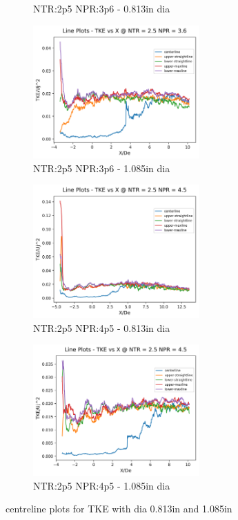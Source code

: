 \begin{figure}[H]
\begin{subfigure}{.5\textwidth}
	\caption{NTR:2p5 NPR:3p6 - 0.813in dia}
	\label{fig:lineplotsTKEb2p53p6}
\end{subfigure}%
\begin{subfigure}{.5\textwidth}
	\centering
	\includegraphics[width=2.5in]{images/LinePlots_TKE_NTR2p5_NPR3p6b.png}
	\caption{NTR:2p5 NPR:3p6 - 1.085in dia}
	\label{fig:lineplotsTKEb2p53p6b}
\end{subfigure}
\begin{subfigure}{.5\textwidth}
	\centering
	\includegraphics[width=2.5in]{images/LinePlots_TKE_NTR2p5_NPR4p5.png}
	\caption{NTR:2p5 NPR:4p5 - 0.813in dia}
	\label{fig:lineplotsTKEb2p54p5}
\end{subfigure}%
\begin{subfigure}{.5\textwidth}
	\centering
	\includegraphics[width=2.5in]{images/LinePlots_TKE_NTR2p5_NPR4p5b.png}
	\caption{NTR:2p5 NPR:4p5 - 1.085in dia}
	\label{fig:lineplotsTKEb2p54p5b}
\end{subfigure}
\caption{centreline plots for TKE with dia 0.813in and 1.085in }
\label{fig:lineplotsTKEb}
\end{figure}


